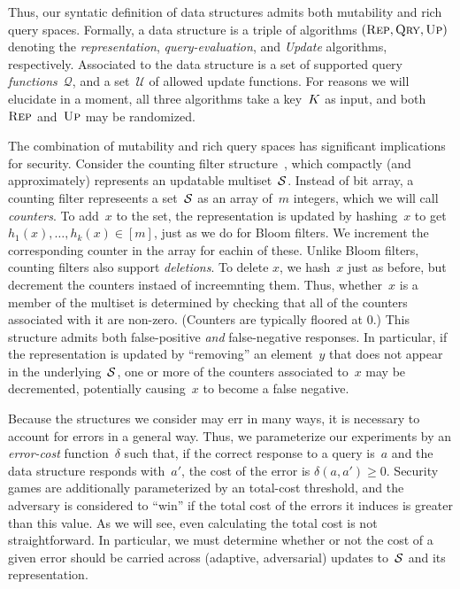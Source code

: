 Thus, our syntatic definition of data structures admits both mutability and rich
query spaces.  Formally, a data structure is a triple of algorithms $(\textnormal{\textsc{Rep}},
\textnormal{\textsc{Qry}}, \textnormal{\textsc{Up}})$ denoting the \emph{representation}, \emph{query-evaluation}, and
\emph{Update} algorithms, respectively. Associated to the data structure is a
set of supported query \emph{functions}~$\mathcal{Q}$, and a set~$\mathcal{U}$
of allowed update functions.  For reasons we will elucidate in a moment, all
three algorithms take a key~$K$ as input, and both~$\textnormal{\textsc{Rep}}$ and~$\textnormal{\textsc{Up}}$ may be
randomized.


The combination of mutability and rich query spaces has significant implications
for security. Consider the counting filter structure~\cite{fan2000summary},
which compactly (and approximately) represents an updatable multiset~$\mathcal{S}$.
Instead of bit array, a counting filter represeents a set~$\mathcal{S}$ as an array
of~$m$ integers, which we will call \emph{counters}. To add~$x$ to the set, the
representation is updated by hashing~$x$ to get $h_1(x), \ldots, h_k(x)\in[m]$,
just as we do for Bloom filters. We increment the corresponding counter in the
array for eachin of these. Unlike Bloom filters, counting filters also support
\emph{deletions}. To delete $x$, we hash~$x$ just as before, but decrement the
counters instaed of increemnting them.
%
Thus, whether~$x$ is a member of the
multiset is determined by checking that all of the counters associated with
it are non-zero.%
%
(Counters are typically floored at 0.)
%
This structure admits both false-positive \emph{and} false-negative responses.
In particular, if the representation is updated by ``removing'' an element~$y$
that does not appear in the underlying~$\mathcal{S}$, one or more of the counters
associated to~$x$ may be decremented, potentially causing~$x$ to become a false
negative.

Because the structures we consider may err in many ways, it is necessary to
account for errors in a general way. Thus, we parameterize our experiments by an
\emph{error-cost} function~$\delta$ such that, if the correct response to a
query is~$a$ and the data structure responds with~$a'$, the cost of the error is
$\delta(a,a') \geq 0$.
%
Security games are additionally parameterized by an total-cost threshold, and
the adversary is considered to ``win'' if the total cost of the errors it induces
is greater than this value.  As we will see, even calculating the
total cost is not straightforward.  In particular, we must determine whether
or not the cost of a given error should be carried across (adaptive,
adversarial) updates to~$\mathcal{S}$ and its representation.


